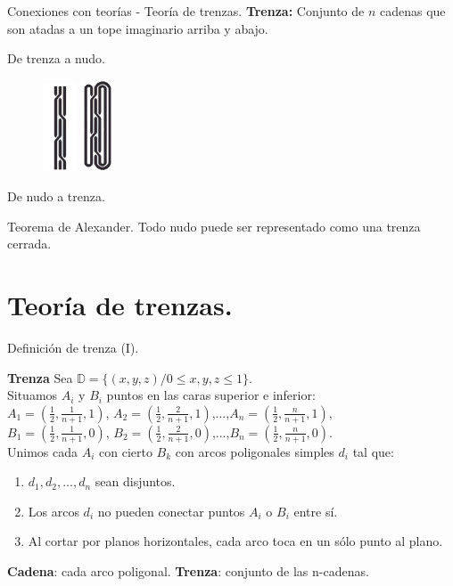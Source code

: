 \documentclass{beamer}
\begin{document}
\begin{frame}{Conexiones con teorías - Teoría de trenzas.}
\textbf{Trenza:} Conjunto de $n$ cadenas que son atadas a un tope imaginario arriba y abajo.
\begin{exampleblock}{De trenza a nudo. }
	\begin{figure}[h!]
		\includegraphics[width=1cm]{imagenes/t2pro.png}
		\includegraphics[width=1cm]{imagenes/t2probien.png}
	\end{figure}
\end{exampleblock}
\begin{exampleblock}{De nudo a trenza. }
	\begin{alertblock}{Teorema de Alexander. }
		 Todo nudo puede ser representado como una trenza cerrada.
	\end{alertblock}
	\end{exampleblock}
\end{frame}


\section{Teoría de trenzas.}
\begin{frame}{Definición de trenza (I).}
\begin{alertblock}{\textbf{Trenza}}
Sea $\mathds{D} = \{(x,y,z) / 0 \leq x,y,z \leq 1\}$.\\
Situamos $A_{i}$ y $B_{i}$ puntos en las caras superior e inferior:\\
$A_{1}=(\frac{1}{2},\frac{1}{n+1},1)$, $A_{2}=(\frac{1}{2},\frac{2}{n+1},1)$,...,$A_{n}=(\frac{1}{2},\frac{n}{n+1},1)$, \\ $B_{1}=(\frac{1}{2},\frac{1}{n+1},0)$, $B_{2}=(\frac{1}{2},\frac{2}{n+1},0)$,...,$B_{n}=(\frac{1}{2},\frac{n}{n+1},0)$.\\
Unimos cada $A_{i}$ con cierto $B_{k}$ con arcos poligonales simples $d_{i}$ tal que:
\begin{enumerate}
	\item $ d_{1}, d_{2},...,d_{n} $ sean disjuntos.
	\item Los arcos $ d_{i} $ no pueden conectar puntos $A_{i}$ o $B_{i}$ entre sí.
	\item Al cortar por planos horizontales, cada arco toca en un sólo punto al plano. 
\end{enumerate}
\textbf{Cadena}: cada arco poligonal.
\textbf{Trenza}: conjunto de las n-cadenas.
\end{alertblock}
\end{frame}
\end{document}

